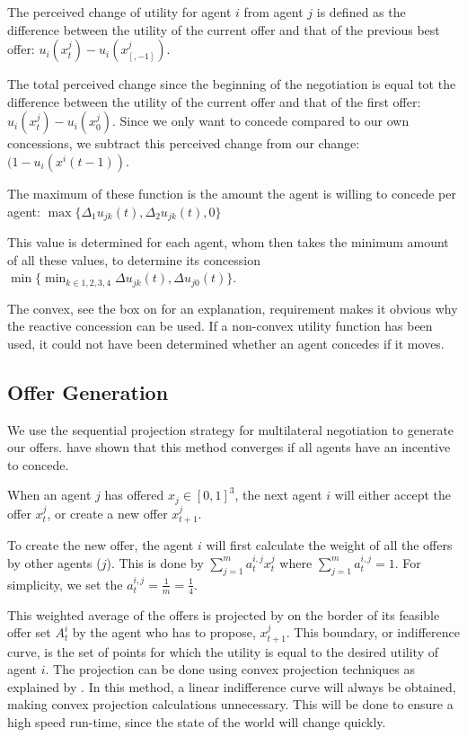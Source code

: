  The perceived change of utility for agent $i$ from agent $j$ is defined as the difference between the utility of the current offer and that of the previous best offer: $u_i(x^j_t)-u_i(x^j_{[,-1]})$.
 
 The total perceived change since the beginning of the negotiation is equal tot the difference between the utility of the current offer and that of the first offer: $u_i(x^j_t)-u_i(x^j_0)$. Since we only want to concede compared to our own concessions, we subtract this perceived change from our change: $(1-u_i(x^i(t-1))$.
 
 The maximum of these function is the amount the agent is willing to concede per agent: $\max \{\Delta_1u_{jk}(t), \Delta_2u_{jk}(t),0\}$

This value is determined for each agent, whom then takes the minimum amount of all these values, to determine its concession $\min \{\displaystyle \min_{k\in 1, 2, 3, 4}\Delta u_{jk}(t), \Delta u_{j0}(t)\}$.

The convex, see the box on  for an explanation, requirement makes it obvious why the reactive concession can be used. If a non-convex utility function has been used, it could not have been determined whether an agent concedes if it moves. 



\subsection{Offer Generation}
\label{sec:des:offer}
We use the sequential projection strategy for multilateral negotiation to generate our offers. \citet{zheng2015automated} have shown that this method converges if all agents have an incentive to concede.

When an agent $j$ has offered $x_j\in[0,1]^3$, the next agent $i$ will either accept the offer $x^j_t$, or create a new offer $x^j_{t+1}$. 

To create the new offer, the agent $i$ will first calculate the weight of all the offers by other agents ($j$). This is done by $\sum_{j=1}^{m} a^{i,j}_t x^j_t $ where $\sum_{j=1}^{m}a^{i,j}_t = 1$. For simplicity, we set the $a^{i,j}_t = \frac{1}{m} = \frac{1}{4}$. 

This weighted average of the offers is projected by on the border of its feasible offer set $A^i_t$ by the agent who has to propose, $x^j_{t+1}$. This boundary, or indifference curve, is the set of points for which the utility is equal to the desired utility of agent $i$. The projection can be done using convex projection techniques as explained by \citet{boyd2004convex}. In this method, a linear indifference curve will always be obtained, making convex projection calculations unnecessary. This will be done to ensure a high speed run-time, since the state of the world will change quickly.


